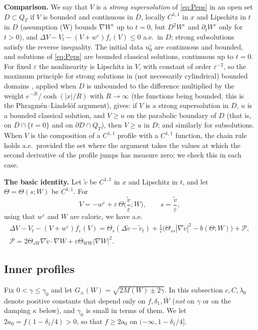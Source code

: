 \documentclass[11pt]{amsart}
\theoremstyle{definition}
\theoremstyle{remark}
\newcommand{\ve}{\varepsilon}
\begin{document}
\textbf{Comparison.} We say that $V$ is a \emph{strong supersolution} of
\eqref{eq:Peps} in an open set $D\subset Q_T$ if $V$ is bounded and continuous in
$\overline D$, locally $C^{1,1}$ in $x$ and Lipschitz in $t$ in $D$ (assumption (W) bounds
$\nabla W^\ve$ up to $t=0$, but $D^2W^\ve$ and $\partial_tW^\ve$ only for $t>0$), and
$\Delta V-V_t-(V+w^\ve)f_\ve(V)\le0$ a.e.\ in $D$; strong
subsolutions satisfy the reverse inequality. The initial data $u_0^\ve$ are continuous
and bounded, and solutions of \eqref{eq:Peps} are bounded classical solutions, continuous
up to $t=0$. For fixed $\ve$ the nonlinearity is
Lipschitz in $V$, with constant of order $\ve^{-2}$, so the maximum principle for strong
solutions in (not necessarily cylindrical) bounded domains
\cite[Chapters~II and VII]{Lieberman1996}, applied when $D$ is unbounded to the difference
multiplied by the weight $e^{-\beta t}/\cosh(|x|/R)$ with $R\to\infty$ (the functions being
bounded, this is the Phragm\'en--Lindel\"of argument), gives: if $V$ is a strong
supersolution in $D$,
$u$ is a bounded classical solution, and $V\ge u$ on the parabolic boundary of
$D$ (that is, on $\overline D\cap\{t=0\}$ and on $\partial D\cap Q_T$), then $V\ge u$ in
$D$; and similarly for subsolutions. When $V$ is the composition of a $C^{1,1}$ profile
with a $C^{1,1}$ function, the chain rule holds a.e.\ provided the set where the argument
takes the values at which the second derivative of the profile jumps has measure zero;
we check this in each case.

\textbf{The basic identity.} Let $\tilde v$ be $C^{1,1}$ in $x$ and Lipschitz in
$t$, and let $\Theta=\Theta(s;W)$ be $C^{1,1}$. For
\[
V=-w^\ve+\ve\,\Theta\Big(\frac{\tilde v}\ve;W\Big),\qquad s=\frac{\tilde v}{\ve},
\]
using that $w^\ve$ and $W$ are caloric, we have a.e.
\begin{equation}\label{q:eq:basic}
\begin{gathered}
\Delta V-V_t-(V+w^\ve)f_\ve(V)=\Theta_s(\Delta\tilde v-\tilde v_t)
+\frac1\ve\big(\Theta_{ss}|\nabla\tilde v|^2-b(\Theta;W)\big)+\mathcal P,\\
\mathcal P=2\Theta_{sW}\nabla\tilde v\cdot\nabla W+\ve\Theta_{WW}|\nabla W|^2 .
\end{gathered}
\end{equation}

\subsection{Inner profiles}
Fix $0<\gamma\le\gamma_0$ and let $G_\pm(W)=\sqrt{2M(W)\pm2\gamma}$. In this
subsection $c,C,\lambda_0$ denote positive constants that depend only on
$f,\delta_1,\bar W$ (\emph{not} on $\gamma$ or on the damping $\kappa$ below), and
$\gamma_0$ is small in terms of them. We let $2a_0=f(1-\delta_1/4)>0$, so that
$f\ge2a_0$ on $(-\infty,1-\delta_1/4]$.
\end{document}

